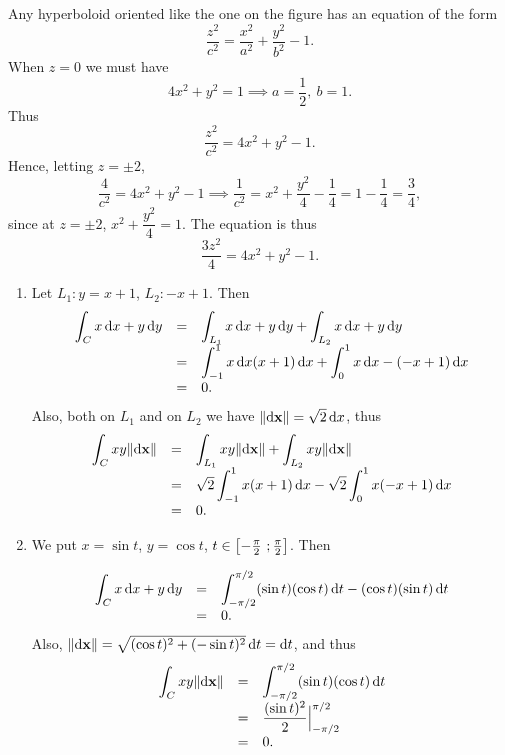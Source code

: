 \begin{Answer}{5.12}
Any hyperboloid oriented like the one on the figure has an equation
of the form
$$ \dfrac{z^2}{c^2}=\dfrac{x^2}{a^2}+\dfrac{y^2}{b^2}-1. $$ When $z=0$ we must have
$$4x^2+y^2=1 \implies a=\dfrac{1}{2}, \ b=1.   $$
Thus
$$ \dfrac{z^2}{c^2}= 4x^2+y^2-1. $$Hence, letting $z=\pm 2$,
$$  \dfrac{4}{c^2} =4x^2+y^2-1 \implies \dfrac{1}{c^2}= x^2+\dfrac{y^2}{4}-\dfrac{1}{4}=1-\dfrac{1}{4}=\dfrac{3}{4},$$
since at $z=\pm 2$, $x^2+\dfrac{y^2}{4}=1$. The equation is thus
$$ \dfrac{3z^2}{4}=  4x^2+y^2-1.$$
\end{Answer}
\begin{Answer}{13.1}
\noindent
\begin{enumerate}
\item  Let $L_1: y =x+1$, $L_2: -x+1$. Then
$$
\begin{array}{lll}
\dint _C x\d{x}+y\d{y} & = & \dint _{L_1} x\d{x}+y\d{y}+\dint _{L_2}
x\d{x}+y\d{y}\\
& = & \dint _{-1} ^1 x\d{x} (x+1)\d{x} + \dint _0 ^1 x\d{x}
-(-x+1)\d{x}\\
& = & 0.
\end{array}
$$
Also, both on $L_1$ and on $L_2$ we have
$\norm{\d{\point{x}}}=\sqrt{2}\d{x}$, thus
$$
\begin{array}{lll}
\dint _C xy \norm{\d{\point{x}}}& = & \dint _{L_1}xy
\norm{\d{\point{x}}}+\dint _{L_2}
xy \norm{\d{\point{x}}}\\
& = & \sqrt{2}\dint _{-1} ^1 x(x+1)\d{x} - \sqrt{2}\dint _0 ^1 x(-x+1)\d{x}\\
& = & 0.
\end{array}
$$

\item We put $x=\sin t$, $y = \cos t$, $t\in\left[-\frac{\pi}{2} \ ; \frac{\pi}{2} \right]$. Then

$$
\begin{array}{lll}
\dint _C x\d{x}+y\d{y} & = & \dint _{-\pi/2} ^{\pi/2}
(\sin t)(\cos t)\d{t}-(\cos t)(\sin t)\d{t}\\
& = & 0.
\end{array}
$$
Also, $\norm{\d{\point{x}}}=\sqrt{(\cos t)^2+(-\sin
t)^2}\d{t}=\d{t}$, and thus
$$
\begin{array}{lll}
\dint _C xy \norm{\d{\point{x}}}& = & \dint _{-\pi/2} ^{\pi/2} (\sin
t)(\cos t) \d{t}\\
& = & \dfrac{(\sin t)^2}{2}\Big| _{-\pi/2} ^{\pi/2} \\
& = & 0.
\end{array}
$$
\end{enumerate}
\end{Answer}
